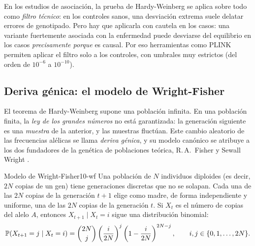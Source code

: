 \begin{cuidado}
En los estudios de asociación, la prueba de Hardy-Weinberg se aplica sobre todo como \emph{filtro técnico}: en los controles sanos, una desviación extrema suele delatar errores de genotipado. Pero hay que aplicarla con cautela en los casos: una variante fuertemente asociada con la enfermedad puede desviarse del equilibrio en los casos \emph{precisamente porque} es causal. Por eso herramientas como PLINK permiten aplicar el filtro solo a los controles, con umbrales muy estrictos (del orden de $10^{-6}$ a $10^{-10}$).
\end{cuidado}

\subsection{Deriva génica: el modelo de Wright-Fisher}

El teorema de Hardy-Weinberg supone una población infinita. En una población finita, la \emph{ley de los grandes números} no está garantizada: la generación siguiente es una \emph{muestra} de la anterior, y las muestras fluctúan. Este cambio aleatorio de las frecuencias alélicas se llama \emph{deriva génica}, y su modelo canónico se atribuye a los dos fundadores de la genética de poblaciones teórica, R.\,A.\ Fisher y Sewall Wright \parencite{c10-fisher1930,c10-wright1931}.

\begin{definicion}{Modelo de Wright-Fisher}{10-wf}
Una población de $N$ individuos diploides (es decir, $2N$ copias de un gen) tiene generaciones discretas que no se solapan. Cada una de las $2N$ copias de la generación $t+1$ elige como madre, de forma independiente y uniforme, una de las $2N$ copias de la generación $t$. Si $X_t$ es el número de copias del alelo $A$, entonces $X_{t+1}\mid X_t=i$ sigue una distribución binomial:
\begin{equation}\label{eq:10-wf}
\mathbb{P}(X_{t+1}=j \mid X_t=i) = \binom{2N}{j}\left(\frac{i}{2N}\right)^{j}\left(1-\frac{i}{2N}\right)^{2N-j},\qquad i,j\in\{0,1,\dots,2N\}.
\end{equation}
\end{definicion}

\begin{simbolos}
\end{simbolos}

